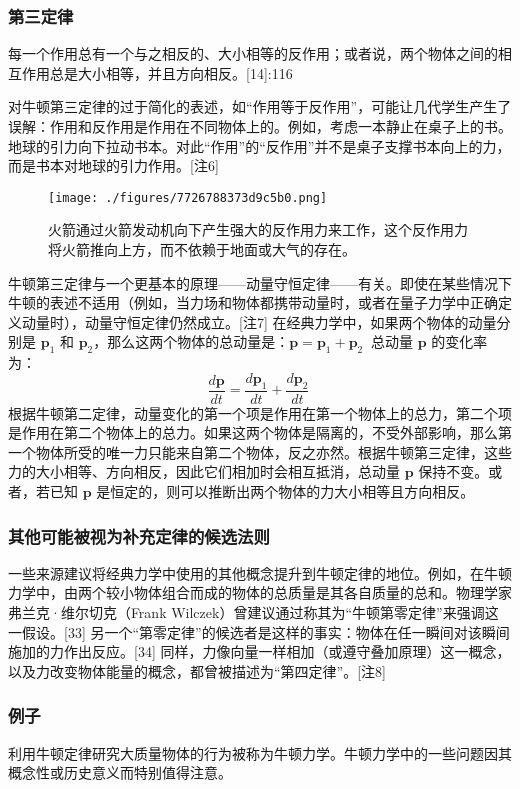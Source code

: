 \subsubsection{第三定律}  
每一个作用总有一个与之相反的、大小相等的反作用；或者说，两个物体之间的相互作用总是大小相等，并且方向相反。[14]:116

对牛顿第三定律的过于简化的表述，如“作用等于反作用”，可能让几代学生产生了误解：作用和反作用是作用在不同物体上的。例如，考虑一本静止在桌子上的书。地球的引力向下拉动书本。对此“作用”的“反作用”并不是桌子支撑书本向上的力，而是书本对地球的引力作用。[注6]
\begin{figure}[ht]
\centering
\texttt{[image: ./figures/7726788373d9c5b0.png]}
\caption{火箭通过火箭发动机向下产生强大的反作用力来工作，这个反作用力将火箭推向上方，而不依赖于地面或大气的存在。} \label{fig_NEW01_3}
\end{figure}
牛顿第三定律与一个更基本的原理——动量守恒定律——有关。即使在某些情况下牛顿的表述不适用（例如，当力场和物体都携带动量时，或者在量子力学中正确定义动量时），动量守恒定律仍然成立。[注7] 在经典力学中，如果两个物体的动量分别是 \( \mathbf{p}_1 \) 和 \( \mathbf{p}_2 \)，那么这两个物体的总动量是：$\mathbf{p} = \mathbf{p}_1 + \mathbf{p}_2~$
总动量 \( \mathbf{p} \) 的变化率为：
\[
\frac{d\mathbf{p}}{dt} = \frac{d\mathbf{p}_1}{dt} + \frac{d\mathbf{p}_2}{dt}~
\]
根据牛顿第二定律，动量变化的第一个项是作用在第一个物体上的总力，第二个项是作用在第二个物体上的总力。如果这两个物体是隔离的，不受外部影响，那么第一个物体所受的唯一力只能来自第二个物体，反之亦然。根据牛顿第三定律，这些力的大小相等、方向相反，因此它们相加时会相互抵消，总动量 \( \mathbf{p} \) 保持不变。或者，若已知 \( \mathbf{p} \) 是恒定的，则可以推断出两个物体的力大小相等且方向相反。
\subsubsection{其他可能被视为补充定律的候选法则}
一些来源建议将经典力学中使用的其他概念提升到牛顿定律的地位。例如，在牛顿力学中，由两个较小物体组合而成的物体的总质量是其各自质量的总和。物理学家弗兰克·维尔切克（Frank Wilczek）曾建议通过称其为“牛顿第零定律”来强调这一假设。[33] 另一个“第零定律”的候选者是这样的事实：物体在任一瞬间对该瞬间施加的力作出反应。[34] 同样，力像向量一样相加（或遵守叠加原理）这一概念，以及力改变物体能量的概念，都曾被描述为“第四定律”。[注8]
\subsubsection{例子}
利用牛顿定律研究大质量物体的行为被称为牛顿力学。牛顿力学中的一些问题因其概念性或历史意义而特别值得注意。
